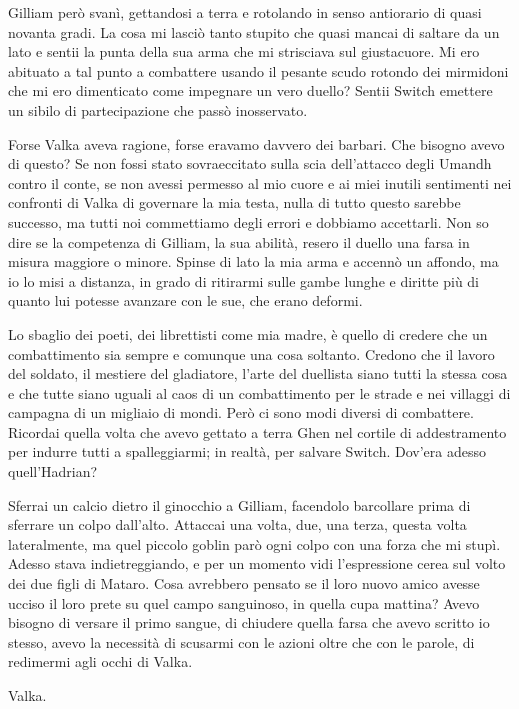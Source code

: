 Gilliam però svanì, gettandosi a terra e rotolando in senso antiorario
di quasi novanta gradi. La cosa mi lasciò tanto stupito che quasi mancai
di saltare da un lato e sentii la punta della sua arma che mi strisciava
sul giustacuore. Mi ero abituato a tal punto a combattere usando il
pesante scudo rotondo dei mirmidoni che mi ero dimenticato come
impegnare un vero duello? Sentii Switch emettere un sibilo di
partecipazione che passò inosservato.

Forse Valka aveva ragione, forse eravamo davvero dei barbari. Che
bisogno avevo di questo? Se non fossi stato sovraeccitato sulla scia
dell'attacco degli Umandh contro il conte, se non avessi permesso al mio
cuore e ai miei inutili sentimenti nei confronti di Valka di governare
la mia testa, nulla di tutto questo sarebbe successo, ma tutti noi
commettiamo degli errori e dobbiamo accettarli. Non so dire se la
competenza di Gilliam, la sua abilità, resero il duello una farsa in
misura maggiore o minore. Spinse di lato la mia arma e accennò un
affondo, ma io lo misi a distanza, in grado di ritirarmi sulle gambe
lunghe e diritte più di quanto lui potesse avanzare con le sue, che
erano deformi.

Lo sbaglio dei poeti, dei librettisti come mia madre, è quello di
credere che un combattimento sia sempre e comunque una cosa soltanto.
Credono che il lavoro del soldato, il mestiere del gladiatore, l'arte
del duellista siano tutti la stessa cosa e che tutte siano uguali al
caos di un combattimento per le strade e nei villaggi di campagna di un
migliaio di mondi. Però ci sono modi diversi di combattere. Ricordai
quella volta che avevo gettato a terra Ghen nel cortile di addestramento
per indurre tutti a spalleggiarmi; in realtà, per salvare Switch.
Dov'era adesso quell'Hadrian?

Sferrai un calcio dietro il ginocchio a Gilliam, facendolo barcollare
prima di sferrare un colpo dall'alto. Attaccai una volta, due, una
terza, questa volta lateralmente, ma quel piccolo goblin parò ogni colpo
con una forza che mi stupì. Adesso stava indietreggiando, e per un
momento vidi l'espressione cerea sul volto dei due figli di Mataro. Cosa
avrebbero pensato se il loro nuovo amico avesse ucciso il loro prete su
quel campo sanguinoso, in quella cupa mattina? Avevo bisogno di versare
il primo sangue, di chiudere quella farsa che avevo scritto io stesso,
avevo la necessità di scusarmi con le azioni oltre che con le parole, di
redimermi agli occhi di Valka.

Valka.

